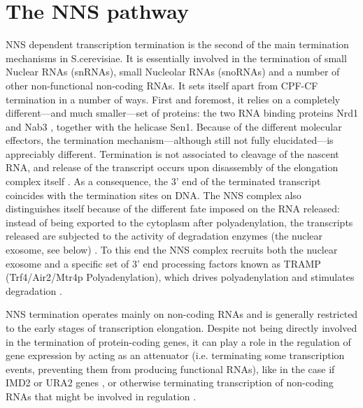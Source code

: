 


\section{The NNS pathway}

NNS dependent transcription termination is the second of the main termination mechanisms in S.cerevisiae. 
It is essentially involved in the termination of small Nuclear RNAs (snRNAs), small Nucleolar RNAs (snoRNAs) and a number of other non-functional non-coding RNAs.
It sets itself apart from CPF-CF termination in a number of ways.
First and foremost, it relies on a completely different---and much smaller---set of proteins: the two RNA binding proteins Nrd1 and Nab3 \cite{conrad:2000:yeast}, together with the helicase Sen1. 
Because of the different molecular effectors, the termination mechanism---although still not fully elucidated---is appreciably different. 
Termination is not associated to cleavage of the nascent RNA, and release of the transcript occurs upon disassembly of the elongation complex itself \cite{steinmetz:2001:rnabinding}. 
As a consequence, the 3’ end of the terminated transcript coincides with the termination sites on DNA. 
The NNS complex also distinguishes itself because of the different fate imposed on the RNA released: instead of being exported to the cytoplasm after polyadenylation, the transcripts released are subjected to the activity of degradation enzymes (the nuclear exosome, see below) \cite{vasiljeva:2006:nrd1}. 
To this end the NNS complex recruits both the nuclear exosome and a specific set of 3' end processing factors known as TRAMP (Trf4/Air2/Mtr4p Polyadenylation), which drives polyadenylation and stimulates degradation \cite{lacava:2005:rna, vasiljeva:2006:nrd1}.

NNS termination operates mainly on non-coding RNAs and is generally restricted to the early stages of transcription elongation. 
Despite not being directly involved in the termination of protein-coding genes, it can play a role in the regulation of gene expression by acting as an attenuator \cite{arigo:2006:regulation}(i.e. terminating some transcription events, preventing them from producing functional RNAs), like in the case if IMD2 or URA2 genes \citep{jenks:2008:properties}, or otherwise terminating transcription of non-coding RNAs that might be involved in regulation \cite{thompson:2007:cytoplasmic}.



